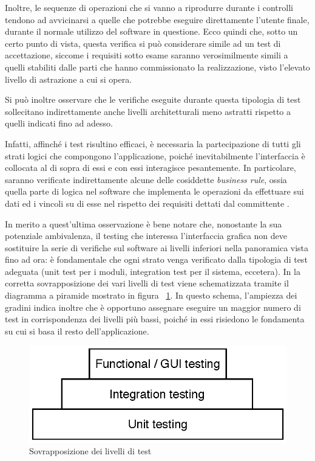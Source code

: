 Inoltre, le sequenze di operazioni che si vanno a riprodurre durante i controlli tendono ad avvicinarsi a quelle che potrebbe eseguire direttamente l'utente finale, durante il normale utilizzo del software in questione. Ecco quindi che, sotto un certo punto di vista, questa verifica si può considerare simile ad un test di accettazione, siccome i requisiti sotto esame saranno verosimilmente simili a quelli stabiliti dalle parti che hanno commissionato la realizzazione, visto l'elevato livello di astrazione a cui si opera.

Si può inoltre osservare che le verifiche eseguite durante questa tipologia di test sollecitano indirettamente anche livelli architetturali meno astratti rispetto a quelli indicati fino ad adesso. 

Infatti, affinché i test risultino efficaci, è necessaria la partecipazione di tutti gli strati logici che compongono l'applicazione, poiché inevitabilmente l'interfaccia è collocata al di sopra di essi e con essi interagisce pesantemente. In particolare, saranno verificate indirettamente alcune delle cosiddette \emph{business rule}, ossia quella parte di logica nel software che implementa le operazioni da effettuare sui dati ed i vincoli su di esse nel rispetto dei requisiti dettati dal committente \cite{agileRequirements}.

In merito a quest'ultima osservazione  è bene notare che, nonostante la sua potenziale ambivalenza, il testing che interessa l'interfaccia grafica non deve sostituire la serie di verifiche sul software ai livelli inferiori nella panoramica vista fino ad ora: è fondamentale che ogni strato venga verificato dalla tipologia di test adeguata (unit test per i moduli, integration test per il sistema, eccetera). In \cite{microsoft} la corretta sovrapposizione dei vari livelli di test viene schematizzata tramite il diagramma a piramide mostrato in figura ~\ref{fig:testPyramid}. In questo schema, l'ampiezza dei gradini indica inoltre che è opportuno assegnare eseguire un maggior numero di test in corrispondenza dei livelli più bassi, poiché in essi risiedono le fondamenta su cui si basa il resto dell'applicazione.

\begin{figure}[htbp]
\begin{center}
\includegraphics[width=\textwidth]{images/test_pyramid.eps}
\caption{Sovrapposizione dei livelli di test}
\label{fig:testPyramid}
\end{center}
\end{figure}

